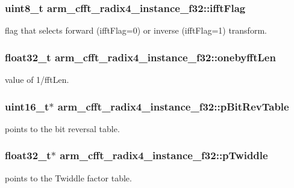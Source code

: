 \subsubsection[{\texorpdfstring{ifft\+Flag}{ifftFlag}}]{\setlength{\rightskip}{0pt plus 5cm}uint8\+\_\+t arm\+\_\+cfft\+\_\+radix4\+\_\+instance\+\_\+f32\+::ifft\+Flag}\hypertarget{structarm__cfft__radix4__instance__f32_a25d1da64dd6487c291f04d226f9acc66}{}\label{structarm__cfft__radix4__instance__f32_a25d1da64dd6487c291f04d226f9acc66}
flag that selects forward (ifft\+Flag=0) or inverse (ifft\+Flag=1) transform. 
\subsubsection[{\texorpdfstring{onebyfft\+Len}{onebyfftLen}}]{\setlength{\rightskip}{0pt plus 5cm}float32\+\_\+t arm\+\_\+cfft\+\_\+radix4\+\_\+instance\+\_\+f32\+::onebyfft\+Len}\hypertarget{structarm__cfft__radix4__instance__f32_ab9eed39e40b8d7c16381fbccf84467cd}{}\label{structarm__cfft__radix4__instance__f32_ab9eed39e40b8d7c16381fbccf84467cd}
value of 1/fft\+Len. 
\subsubsection[{\texorpdfstring{p\+Bit\+Rev\+Table}{pBitRevTable}}]{\setlength{\rightskip}{0pt plus 5cm}uint16\+\_\+t$\ast$ arm\+\_\+cfft\+\_\+radix4\+\_\+instance\+\_\+f32\+::p\+Bit\+Rev\+Table}\hypertarget{structarm__cfft__radix4__instance__f32_a8da0d2ca69749fde8cbb95caeac6fe6a}{}\label{structarm__cfft__radix4__instance__f32_a8da0d2ca69749fde8cbb95caeac6fe6a}
points to the bit reversal table. 
\subsubsection[{\texorpdfstring{p\+Twiddle}{pTwiddle}}]{\setlength{\rightskip}{0pt plus 5cm}float32\+\_\+t$\ast$ arm\+\_\+cfft\+\_\+radix4\+\_\+instance\+\_\+f32\+::p\+Twiddle}\hypertarget{structarm__cfft__radix4__instance__f32_a14860c7544911702ca1fa0bf78204ef3}{}\label{structarm__cfft__radix4__instance__f32_a14860c7544911702ca1fa0bf78204ef3}
points to the Twiddle factor table. 

